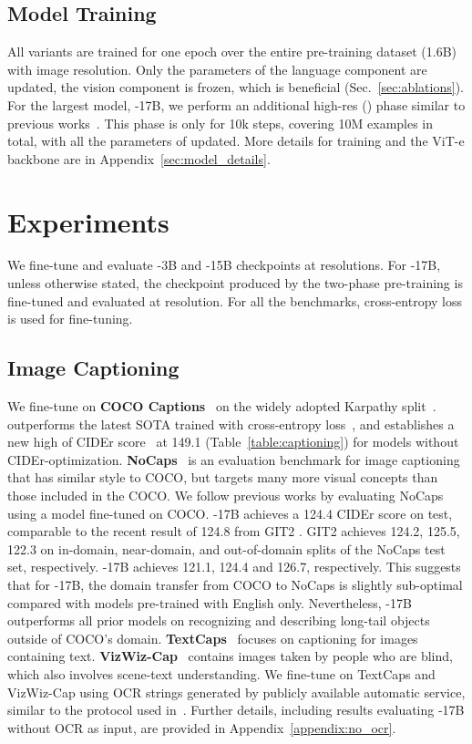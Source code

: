 \documentclass{article}
\begin{document}
\subsection{Model Training}
\label{sec:training}
All \NAME variants are trained for one epoch over the entire pre-training dataset (1.6B) with  image resolution. Only the parameters of the language component are updated, the vision component is frozen, which is beneficial (Sec.~\ref{sec:ablations}). For the largest model, \NAME-17B, we perform an additional high-res () phase similar to previous works~\citep{clip,florence,coca}.
This phase is only for 10k steps, covering 10M examples in total, with all the parameters of \NAME updated.
More details for training \NAME and the ViT-e backbone are in Appendix~\ref{sec:model_details}.
\section{Experiments}
\label{sec:results}

We fine-tune and evaluate \NAME-3B and \NAME-15B checkpoints at  resolutions. For \NAME-17B, unless otherwise stated, the checkpoint produced by the two-phase pre-training is fine-tuned and evaluated at  resolution. For all the benchmarks, cross-entropy loss is used for fine-tuning. 

\subsection{Image Captioning}

We fine-tune on \textbf{COCO Captions}~\citep{coco} on the widely adopted Karpathy split~\citep{cocokarp}. \NAME outperforms the latest SOTA trained with cross-entropy loss~\citep{beit3}, and establishes a new high of CIDEr score~\citep{cider} at 149.1 (Table~\ref{table:captioning}) for models without CIDEr-optimization. \textbf{NoCaps}~\citep{nocaps} is an evaluation benchmark for image captioning that has similar style to COCO, but targets many more visual concepts than those included in the COCO.
We follow previous works by evaluating NoCaps using a model fine-tuned on COCO.
\NAME-17B achieves a 124.4 CIDEr score on test, comparable to the recent result of 124.8 from GIT2 \citep{git}.
GIT2 achieves 124.2, 125.5, 122.3 on in-domain, near-domain, and out-of-domain splits of the NoCaps test set, respectively.
\NAME-17B achieves 121.1, 124.4 and 126.7, respectively.
This suggests that for \NAME-17B, the domain transfer from COCO to NoCaps is slightly sub-optimal compared with models pre-trained with English only.
Nevertheless, \NAME-17B outperforms all prior models on recognizing and describing long-tail objects outside of COCO's domain. \textbf{TextCaps}~\citep{textcaps} focuses on captioning for images containing text. \textbf{VizWiz-Cap}~\citep{gurari2020captioning} contains images taken by people who are blind, which also involves scene-text understanding.
We fine-tune on TextCaps and VizWiz-Cap using OCR strings generated by publicly available automatic service, similar to the protocol used in~\citep{tap}. Further details, including results evaluating \NAME-17B without OCR as input, are provided in Appendix~\ref{appendix:no_ocr}.
\end{document}
